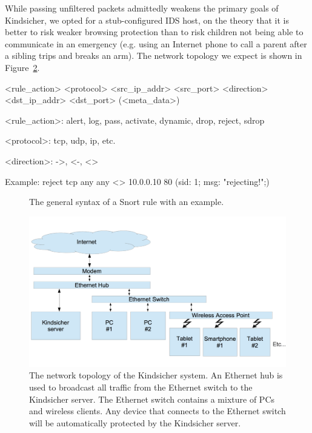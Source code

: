 While passing unfiltered packets admittedly weakens the primary goals of
Kindsicher, we opted for a stub-configured IDS host, on the theory that it is
better to risk weaker browsing protection than to risk children not being able
to communicate in an emergency (e.g. using an Internet phone to call a parent
after a sibling trips and breaks an arm). The network topology we expect is
shown in Figure~\ref{fig:topology}.


\begin{verbbox}
<rule_action> <protocol>
    <src_ip_addr> <src_port>
    <direction>
    <dst_ip_addr> <dst_port>
    (<meta_data>)


<rule_action>: alert, log, pass, activate,
    dynamic, drop, reject, sdrop

<protocol>: tcp, udp, ip, etc.

<direction>: ->, <-, <>

Example:
reject tcp
    any any
    <>
    10.0.0.10 80
    (sid: 1; msg: "rejecting!";)

\end{verbbox}

\begin{figure}[!t]
    \centering
    \theverbbox
    \caption{The general syntax of a Snort rule with an example.}
    \label{fig:rule_syntax}
\end{figure}


\begin{figure}[!t]
    \centering
    \includegraphics[width=2\columnwidth]{figures/topology}
    \caption{The network topology of the Kindsicher system. An Ethernet hub is
        used to broadcast all traffic from the Ethernet switch to the
        Kindsicher server. The Ethernet switch contains a mixture of PCs and
        wireless clients. Any device that connects to the Ethernet switch will
        be automatically protected by the Kindsicher server.}
    \label{fig:topology}
\end{figure}

